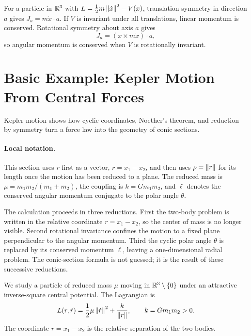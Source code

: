 \begin{example}
For a particle in \(\mathbb{R}^3\) with \(L=\frac12m\left\lVert \dot x\right\rVert^2-V(x)\), translation
symmetry in direction \(a\) gives \(J_a=m\dot x\cdot a\). If \(V\) is invariant
under all translations, linear momentum is conserved. Rotational symmetry about
axis \(a\) gives
\[
  J_a=(x\times m\dot x)\cdot a,
\]
so angular momentum is conserved when \(V\) is rotationally invariant.
\end{example}

\section{Basic Example: Kepler Motion From Central Forces}
\label{sec:kepler-lagrangian}

Kepler motion shows how cyclic coordinates, Noether's theorem, and reduction by
symmetry turn a force law into the geometry of conic sections.

\paragraph{Local notation.}
This section uses \(r\) first as a vector, \(r=x_1-x_2\), and then uses
\(\rho=\left\lVert r\right\rVert\) for its length once the motion has been reduced to a plane.
The reduced mass is \(\mu=m_1m_2/(m_1+m_2)\), the coupling is
\(k=Gm_1m_2\), and \(\ell\) denotes the conserved angular momentum conjugate to
the polar angle \(\theta\).

The calculation proceeds in three reductions.  First the two-body problem is
written in the relative coordinate \(r=x_1-x_2\), so the center of mass is no
longer visible.  Second rotational invariance confines the motion to a fixed
plane perpendicular to the angular momentum.  Third the cyclic polar angle
\(\theta\) is replaced by its conserved momentum \(\ell\), leaving a
one-dimensional radial problem.  The conic-section formula is not guessed; it
is the result of these successive reductions.

\begin{assumption}
We study a particle of reduced mass \(\mu\) moving in \(\mathbb{R}^3\setminus\{0\}\)
under an attractive inverse-square central potential. The Lagrangian is
\[
  L(r,\dot r)
  =
  \frac12\mu\left\lVert \dot r\right\rVert^2+\frac{k}{\left\lVert r\right\rVert},
  \qquad
  k=Gm_1m_2>0.
\]
The coordinate \(r=x_1-x_2\) is the relative separation of the two bodies.
\end{assumption}

